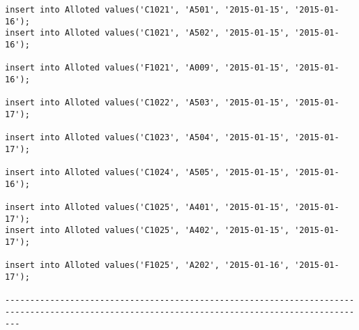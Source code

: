 \documentclass[a4,12pt]{report}
\begin{document}
\begin{lstlisting}
insert into Alloted values('C1021', 'A501', '2015-01-15', '2015-01-16');
insert into Alloted values('C1021', 'A502', '2015-01-15', '2015-01-16');

insert into Alloted values('F1021', 'A009', '2015-01-15', '2015-01-16');

insert into Alloted values('C1022', 'A503', '2015-01-15', '2015-01-17');

insert into Alloted values('C1023', 'A504', '2015-01-15', '2015-01-17');

insert into Alloted values('C1024', 'A505', '2015-01-15', '2015-01-16');

insert into Alloted values('C1025', 'A401', '2015-01-15', '2015-01-17');
insert into Alloted values('C1025', 'A402', '2015-01-15', '2015-01-17');

insert into Alloted values('F1025', 'A202', '2015-01-16', '2015-01-17');

-----------------------------------------------------------------------------------------------------------------------------------------------

\end{lstlisting}
\end{document}
